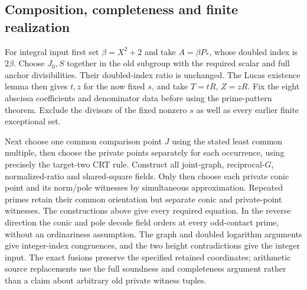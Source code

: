 \subsection{Composition, completeness and finite realization}
\label{sec:quartic-composition}

For integral input first set $\beta=X^2+2$ and
take $A=\beta P_*$, whose doubled index is $2\beta$. Choose $J_0,S$ together in the old subgroup with the
required scalar and full anchor divisibilities. Their doubled-index ratio is unchanged. The Lucas existence lemma
then gives $t,z$ for the now fixed $s$, and take $T=tR$,
$Z=zR$. Fix the eight abscissa coefficients and denominator data before
using the prime-pattern theorem. Exclude the divisors of the fixed nonzero
$s$ as well as every earlier finite exceptional set.

Next choose one common comparison point $J$ using the stated least common
multiple, then choose the private points separately for each occurrence,
using precisely the target-two CRT rule.
Construct all joint-graph, reciprocal-$G$, normalized-ratio and
shared-square fields. Only then choose each private conic point and its
norm/pole witnesses by simultaneous approximation. Repeated primes retain
their common orientation but separate conic and private-point witnesses.
The constructions above give every required equation. In the reverse
direction the conic and pole decode field orders at every odd-contact
prime, without an ordinariness assumption. The graph and doubled logarithm
arguments give integer-index congruences, and the two height contradictions
give the integer input. The exact fusions preserve the specified
retained coordinates; arithmetic source replacements use the full
soundness and completeness argument rather than a claim about arbitrary
old private witness tuples.

